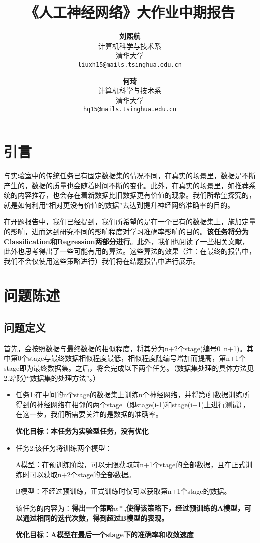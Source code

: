 \documentclass{article}
\title{《人工神经网络》大作业中期报告}
\author{
  \textbf{刘熙航}\\
  计算机科学与技术系 \\
  清华大学 \\
  \texttt{liuxh15@mails.tsinghua.edu.cn} \\
  \and
  \textbf{何琦}\\
  计算机科学与技术系 \\
  清华大学 \\
  \texttt{hq15@mails.tsinghua.edu.cn} \\
}
\begin{document}
\maketitle

\section{引言}

与实验室中的传统任务已有固定数据集的情况不同，在真实的场景里，数据是不断产生的，数据的质量也会随着时间不断的变化。此外，在真实的场景里，如推荐系统的内容推荐，也会存在着新数据比旧数据更有价值的现象。我们所希望探究的，就是如何利用“相对更没有价值的数据”去达到提升神经网络准确率的目的。

在开题报告中，我们已经提到，我们所希望的是在一个已有的数据集上，施加定量的影响，进而达到研究不同的影响程度对学习准确率影响的目的。\textbf{该任务将分为Classification和Regression两部分进行}。此外，我们也阅读了一些相关文献，此外也思考得出了一些可能有用的算法。这些算法的效果（注：在最终的报告中，我们不会仅使用这些策略进行）我们将在结题报告中进行展示。

\section{问题陈述}
\subsection{问题定义}
首先，会按照数据与最终数据的相似程度，将其分为n+2个stage(编号0~n+1)。其中第0个stage与最终数据相似程度最低，相似程度随编号增加而提高，第n+1个stage即为最终数据集。之后，将会完成以下两个任务。（数据集处理的具体方法见2.2部分“数据集的处理方法”。）
\begin{itemize}
    \item 任务1:在中间的n个stage的数据集上训练n个神经网络，并将第i组数据训练所得到的神经网络在相邻的两个stage（即stage(i-1)和stage(i+1)上进行测试），在这一步，我们所需要关注的是数据的准确率。
    
    \textbf{优化目标：本任务为实验型任务，没有优化}
    
    \item 任务2:该任务将训练两个模型：
    
    A模型：在预训练阶段，可以无限获取前n+1个stage的全部数据，且在正式训练时可以获取n+2个stage的全部数据。

    B模型：不经过预训练，正式训练时仅可以获取第n+1个stage的数据。

    该任务的内容为：\textbf{得出一个策略$\alpha*$,使得该策略下，经过预训练的A模型，可以通过相同的迭代次数，得到超过B模型的表现。}
    
    \textbf{优化目标：A模型在最后一个stage下的准确率和收敛速度}
\end{itemize}
\end{document}
